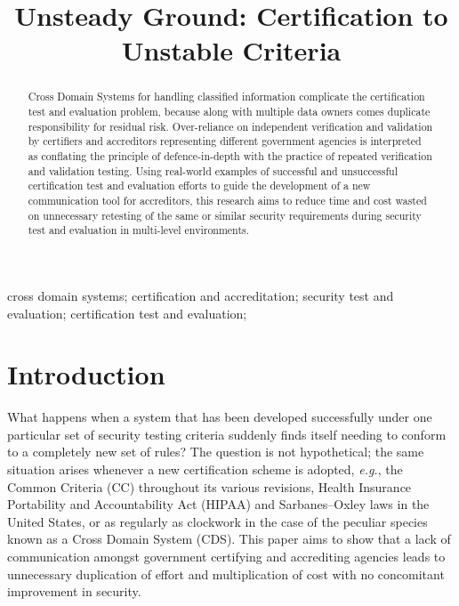 \documentclass[10pt,letterpaper,conference,compsocconf]{IEEEtran}
\begin{document}
\title{Unsteady Ground: Certification to Unstable Criteria}

\author{
}

\maketitle

\begin{abstract}
Cross Domain Systems for handling classified information
complicate the certification test and evaluation
problem, because along with multiple data owners comes duplicate
responsibility for residual risk.  Over-reliance on independent
verification and validation by certifiers and
accreditors representing different government agencies is interpreted as
conflating the principle of defence-in-depth with the practice of
repeated verification and validation testing.   Using real-world
examples of successful and unsuccessful certification test and
evaluation efforts to guide the development
of a new communication tool for accreditors, this research
aims to reduce time and cost wasted on unnecessary retesting of
the same or similar security requirements during
security test and evaluation in multi-level environments.
\end{abstract}

\def\IEEEkeywordsname{Keywords}

\begin{IEEEkeywords}
	cross domain systems; certification and accreditation;
	security test and evaluation; certification test and evaluation;
\end{IEEEkeywords}

\IEEEpeerreviewmaketitle

\section{Introduction}

What happens when a system that has been developed successfully under
one particular set of security testing criteria suddenly finds itself
needing to conform to a completely new set of rules?  The question is not
hypothetical; the same situation arises whenever a new certification scheme
is adopted, {\it e.g.}, the Common Criteria (CC) throughout its various revisions,
Health Insurance Portability and Accountability Act (HIPAA) and
Sarbanes--Oxley laws in the United States, or as regularly as clockwork
in the case of the peculiar species known as a Cross Domain System (CDS).
This paper aims to show that a lack of communication amongst government certifying
and accrediting agencies
leads to unnecessary duplication of effort and multiplication of cost with
no concomitant improvement in security.
\end{document}
